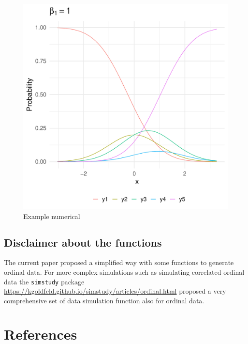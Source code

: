 \documentclass[
  man,floatsintext]{apa6}
\begin{document}
\normalsize

\scriptsize

\begin{figure}

{\centering \includegraphics{paper-new_files/figure-latex/ex-numerical-1} 

}

\caption{Example numerical}\label{fig:ex-numerical}
\end{figure}

\normalsize

\subsection{Disclaimer about the functions}\label{disclaimer-about-the-functions}

The current paper proposed a simplified way with some functions to generate ordinal data. For more complex simulations such as simulating correlated ordinal data the \texttt{simstudy} package \url{https://kgoldfeld.github.io/simstudy/articles/ordinal.html} proposed a very comprehensive set of data simulation function also for ordinal data.

\newpage

\section{References}\label{references}
\end{document}
